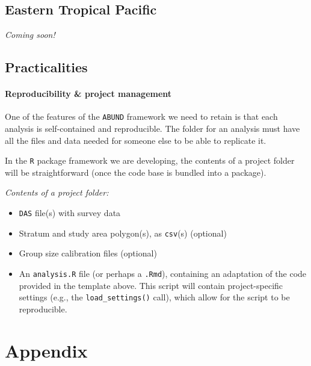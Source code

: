 \documentclass[
]{book}
\providecommand{\tightlist}{%
  \setlength{\itemsep}{0pt}\setlength{\parskip}{0pt}}
\begin{document}
\hypertarget{eastern-tropical-pacific}{%
\chapter{Eastern Tropical Pacific}\label{eastern-tropical-pacific}}

\emph{Coming soon!}

\hypertarget{practicalities}{%
\chapter{Practicalities}\label{practicalities}}

\hypertarget{reproducibility-project-management}{%
\subsection*{Reproducibility \& project management}\label{reproducibility-project-management}}

One of the features of the \texttt{ABUND} framework we need to retain is that each analysis is self-contained and reproducible. The folder for an analysis must have all the files and data needed for someone else to be able to replicate it.

In the \texttt{R} package framework we are developing, the contents of a project folder will be straightforward (once the code base is bundled into a package).

\emph{Contents of a project folder:}

\begin{itemize}
\tightlist
\item
  \texttt{DAS} file(s) with survey data\\
\item
  Stratum and study area polygon(s), as \texttt{csv}(s) (optional)\\
\item
  Group size calibration files (optional)\\
\item
  An \texttt{analysis.R} file (or perhaps a \texttt{.Rmd}), containing an adaptation of the code provided in the template above. This script will contain project-specific settings (e.g., the \texttt{load\_settings()} call), which allow for the script to be reproducible.
\end{itemize}

\hypertarget{part-appendix}{%
\part{Appendix}\label{part-appendix}}
\end{document}

